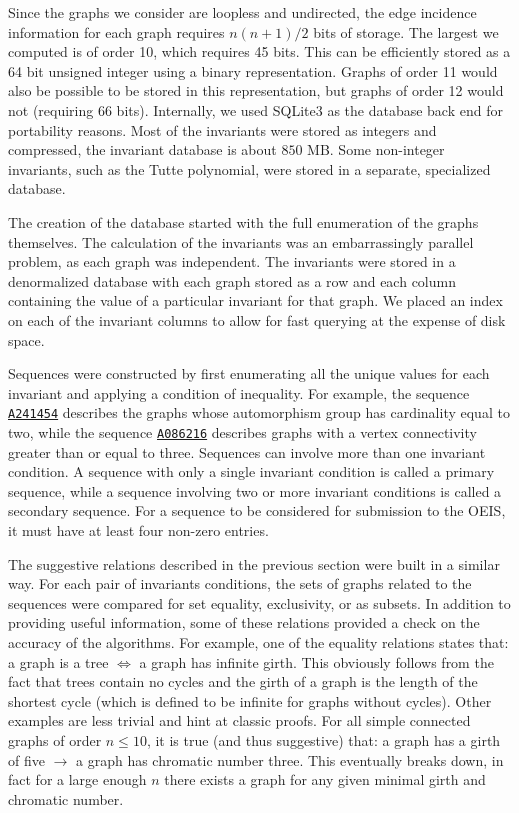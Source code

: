 \documentclass[12pt]{article}
\newcommand{\OEIS}[1]
{\href{https://oeis.org/#1}{\texttt{#1}}}
\begin{document}
Since the graphs we consider are loopless and undirected, the edge incidence information for each graph requires $n(n+1)/2$ bits of storage.
The largest we computed is of order 10, which requires 45 bits. 
This can be efficiently stored as a 64 bit unsigned integer using a binary representation.
Graphs of order 11 would also be possible to be stored in this representation, but graphs of order 12 would not (requiring 66 bits).
Internally, we used SQLite3 as the database back end for portability reasons.
Most of the invariants were stored as integers and compressed, the invariant database is about $850$ MB.
Some non-integer invariants, such as the Tutte polynomial, were stored in a separate, specialized database.

The creation of the database started with the full enumeration of the graphs themselves.
The calculation of the invariants was an embarrassingly parallel problem, as each graph was independent.
The invariants were stored in a denormalized database with each graph stored as a row and each column containing the value of a particular invariant for that graph. 
We placed an index on each of the invariant columns to allow for fast querying at the expense of disk space.

Sequences were constructed by first enumerating all the unique values for each invariant and applying a condition of inequality. 
For example, the sequence \OEIS{A241454} describes the graphs whose automorphism group has cardinality equal to two, while the sequence \OEIS{A086216} describes graphs with a vertex connectivity greater than or equal to three. 
Sequences can involve more than one invariant condition.
A sequence with only a single invariant condition is called a primary sequence, while a sequence involving two or more invariant conditions is called a secondary sequence.
For a sequence to be considered for submission to the OEIS, it must have at least four non-zero entries. 

The suggestive relations described in the previous section were built in a similar way.
For each pair of invariants conditions, the sets of graphs related to the sequences were compared for set equality, exclusivity, or as subsets.
In addition to providing useful information, some of these relations provided a check on the accuracy of the algorithms.
For example, one of the equality relations states that: a graph is a tree $\Leftrightarrow$ a graph has infinite girth.
This obviously follows from the fact that trees contain no cycles and the girth of a graph is the length of the shortest cycle (which is defined to be infinite for graphs without cycles).
Other examples are less trivial and hint at classic proofs.
For all simple connected graphs of order $n\le10$, it is true (and thus suggestive) that: a graph has a girth of five $\rightarrow$ a graph has chromatic number three. 
This eventually breaks down, in fact for a large enough $n$ there exists a graph for any given minimal girth and chromatic number\cite{erdos1959graph}.
\end{document}

